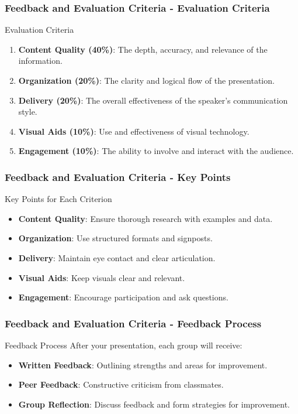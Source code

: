 \documentclass[aspectratio=169]{beamer}
\begin{document}
\begin{frame}[fragile]
    \frametitle{Feedback and Evaluation Criteria - Evaluation Criteria}
    \begin{block}{Evaluation Criteria}
        \begin{enumerate}
            \item \textbf{Content Quality (40\%)}: The depth, accuracy, and relevance of the information.
            \item \textbf{Organization (20\%)}: The clarity and logical flow of the presentation.
            \item \textbf{Delivery (20\%)}: The overall effectiveness of the speaker's communication style.
            \item \textbf{Visual Aids (10\%)}: Use and effectiveness of visual technology.
            \item \textbf{Engagement (10\%)}: The ability to involve and interact with the audience.
        \end{enumerate}
    \end{block}
\end{frame}

\begin{frame}[fragile]
    \frametitle{Feedback and Evaluation Criteria - Key Points}
    \begin{block}{Key Points for Each Criterion}
        \begin{itemize}
            \item \textbf{Content Quality}: Ensure thorough research with examples and data.
            \item \textbf{Organization}: Use structured formats and signposts.
            \item \textbf{Delivery}: Maintain eye contact and clear articulation.
            \item \textbf{Visual Aids}: Keep visuals clear and relevant.
            \item \textbf{Engagement}: Encourage participation and ask questions.
        \end{itemize}
    \end{block}
\end{frame}

\begin{frame}[fragile]
    \frametitle{Feedback and Evaluation Criteria - Feedback Process}
    \begin{block}{Feedback Process}
        After your presentation, each group will receive:
        \begin{itemize}
            \item \textbf{Written Feedback}: Outlining strengths and areas for improvement.
            \item \textbf{Peer Feedback}: Constructive criticism from classmates.
            \item \textbf{Group Reflection}: Discuss feedback and form strategies for improvement.
        \end{itemize}
    \end{block}
\end{frame}
\end{document}
